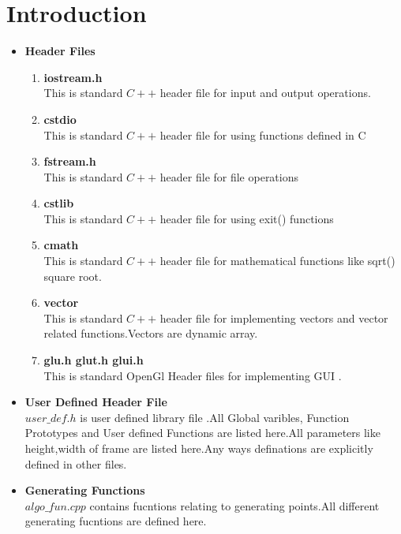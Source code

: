\documentclass[a4paper,10pt]{report}
\begin{document}
\chapter{Introduction}
\begin{itemize}
 \item \textbf {Header Files}
      \begin{enumerate}

      \item \textbf{iostream.h} \\
           This is standard $C++$ header file for input and output operations.      
      \item \textbf{cstdio}\\
           This is standard $C++$ header file for using functions defined in C
      \item \textbf{fstream.h} \\
           This is standard $C++$ header file for  file operations
      \item \textbf{cstlib}\\
            This is standard $C++$ header file for using exit() functions
      \item \textbf{cmath}  \\
            This is standard $C++$ header file for mathematical functions like sqrt() square root.
      \item \textbf{vector}  \\
            This is standard $C++$ header file for implementing vectors and vector related functions.Vectors are dynamic
            array.
      \item \textbf{glu.h glut.h glui.h}\\
            This is standard OpenGl Header files for implementing GUI .
\end{enumerate}

\item \textbf{User Defined Header File} \\
            $user\_def.h$ is user defined library file .All Global varibles, Function Prototypes and User defined Functions are
            listed here.All parameters like height,width of frame are listed here.Any ways definations are explicitly 
            defined in other files.
 
\item \textbf{Generating Functions}        \\
            $algo\_fun.cpp$ contains fucntions relating to generating points.All different generating fucntions are
            defined here.


\end{itemize}
\end{document}
